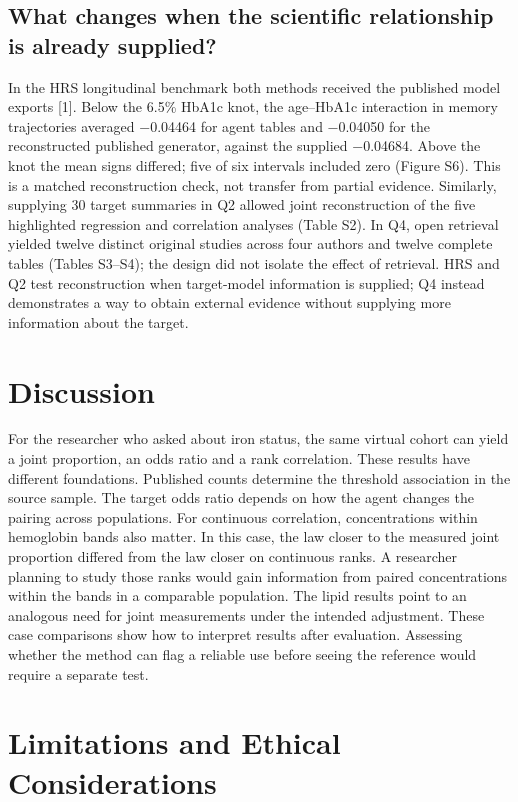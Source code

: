 \documentclass[sigconf,review]{acmart}
\begin{document}
\subsection{What changes when the scientific relationship is already supplied?}

In the HRS longitudinal benchmark both methods received the published model exports [1]. Below the 6.5\% HbA1c knot, the age–\allowbreak{}HbA1c interaction in memory trajectories averaged −0.04464 for agent tables and −0.04050 for the reconstructed published generator, against the supplied −0.04684. Above the knot the mean signs differed; five of six intervals included zero (Figure S6). This is a matched reconstruction check, not transfer from partial evidence. Similarly, supplying 30 target summaries in Q2 allowed joint reconstruction of the five highlighted regression and correlation analyses (Table S2). In Q4, open retrieval yielded twelve distinct original studies across four authors and twelve complete tables (Tables S3–\allowbreak{}S4); the design did not isolate the effect of retrieval. HRS and Q2 test reconstruction when target-model information is supplied; Q4 instead demonstrates a way to obtain external evidence without supplying more information about the target.


\section{Discussion}

For the researcher who asked about iron status, the same virtual cohort can yield a joint proportion, an odds ratio and a rank correlation. These results have different foundations. Published counts determine the threshold association in the source sample. The target odds ratio depends on how the agent changes the pairing across populations. For continuous correlation, concentrations within hemoglobin bands also matter. In this case, the law closer to the measured joint proportion differed from the law closer on continuous ranks. A researcher planning to study those ranks would gain information from paired concentrations within the bands in a comparable population. The lipid results point to an analogous need for joint measurements under the intended adjustment. These case comparisons show how to interpret results after evaluation. Assessing whether the method can flag a reliable use before seeing the reference would require a separate test.


\section{Limitations and Ethical Considerations}
\end{document}

